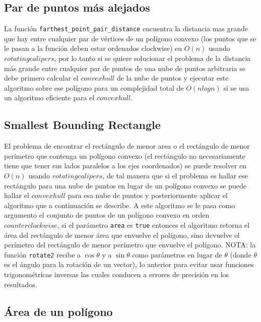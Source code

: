 \documentclass[10pt,letterpaper,twocolumn,twosided]{article}
\newcommand{\codigofuente}[1]{

\dotfill
}
\begin{document}
\codigofuente{src/geom/closestpair.cpp}

\subsection{Par de puntos más alejados}

La función \verb+farthest_point_pair_distance+ encuentra la distancia mas grande que hay entre cualquier par de vértices de un polígono convexo (los puntos que se le pasan a la función deben estar ordenados clockwise) en $O(n)$ usando $rotating calipers$, por lo tanto si se quiere solucionar el problema de la distancia más grande entre cualquier par de puntos de una nube de puntos arbitraria se debe primero calcular el $convexhull$ de la nube de puntos y ejecutar este algoritmo sobre ese polígono para un complejidad total de $O(nlogn)$ si se usa un algoritmo eficiente para el $convexhull$.

\codigofuente{src/geom/farthest_point_pair_distance.cpp}


\subsection{Smallest Bounding Rectangle}

El problema de encontrar el rectángulo de menor area o el rectángulo de menor perímetro que contenga un polígono convexo (el rectángulo no necesariamente tiene que tener sus lados paralelos a los ejes coordenados) se puede resolver en $O(n)$ usando $rotating calipers$, de tal manera que si el problema es hallar ese rectángulo para una nube de puntos en lugar de un polígono convexo se puede hallar el $convex hull$ para esa nube de puntos y posteriormente aplicar el algoritmo que a continuación se describe. A este algoritmo se le pasa como argumento el conjunto de puntos de un polígono convexo en orden $counterclockwise$, si el parámetro \verb+area+ es \verb+true+ entonces el algoritmo retorna el área del rectángulo de menor área que envuelve el polígono, sino devuelve el perímetro del rectángulo de menor perímetro que envuelve el polígono.
NOTA: la función \verb+rotate2+ recibe a $\cos\theta$ y a $\sin\theta$ como parámetros en lugar de $\theta$ (donde $\theta$ es el ángulo para la rotación de un vector), lo anterior para evitar usar funciones trigonométricas inversas las cuales conducen a errores de precisión en los resultados.

\codigofuente{src/geom/smallestboundingrectangle.cpp}

\subsection{Área de un polígono}
\end{document}
